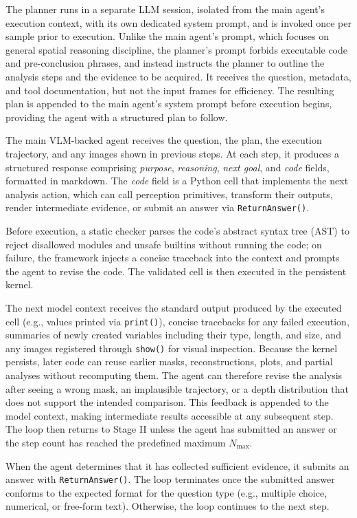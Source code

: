 The planner runs in a separate LLM session, isolated from the main agent's execution context, with its own dedicated system prompt, and is invoked once per sample prior to execution.
Unlike the main agent's prompt, which focuses on general spatial reasoning discipline, the planner's prompt forbids executable code and pre-conclusion phrases, and instead instructs the planner to outline the analysis steps and the evidence to be acquired.
It receives the question, metadata, and tool documentation, but not the input frames for efficiency.
The resulting plan is appended to the main agent's system prompt before execution begins, providing the agent with a structured plan to follow.


The main VLM-backed agent receives the question, the plan, the execution trajectory, and any images shown in previous steps.
At each step, it produces a structured response comprising \textit{purpose}, \textit{reasoning}, \textit{next goal}, and \textit{code} fields, formatted in markdown.
The \textit{code} field is a Python cell that implements the next analysis action, which can call perception primitives, transform their outputs, render intermediate evidence, or submit an answer via \texttt{ReturnAnswer()}.

Before execution, a static checker parses the code's abstract syntax tree (AST) to reject disallowed modules and unsafe builtins without running the code; on failure, the framework injects a concise traceback into the context and prompts the agent to revise the code.
The validated cell is then executed in the persistent kernel.

The next model context receives the standard output produced by the executed cell (e.g., values printed via \texttt{print()}), concise tracebacks for any failed execution, summaries of newly created variables including their type, length, and size, and any images registered through \texttt{show()} for visual inspection.
Because the kernel persists, later code can reuse earlier masks, reconstructions, plots, and partial analyses without recomputing them.
The agent can therefore revise the analysis after seeing a wrong mask, an implausible trajectory, or a depth distribution that does not support the intended comparison. 
This feedback is appended to the model context, making intermediate results accessible at any subsequent step.
The loop then returns to Stage II unless the agent has submitted an answer or the step count has reached the predefined maximum $N_{\text{max}}$.

When the agent determines that it has collected sufficient evidence, it submits an answer with \texttt{ReturnAnswer()}.
The loop terminates once the submitted answer conforms to the expected format for the question type (e.g., multiple choice, numerical, or free-form text). Otherwise, the loop continues to the next step. 
